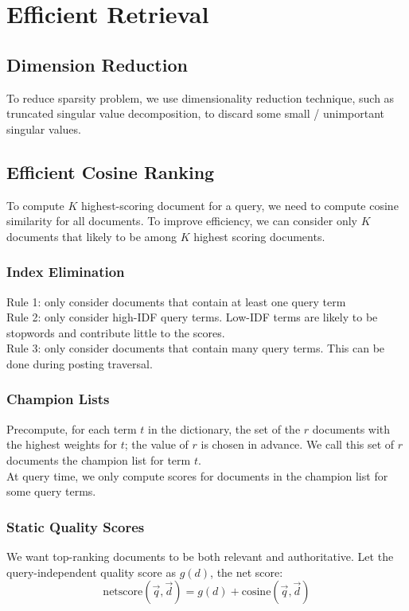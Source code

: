 \chapter{Efficient Retrieval}

\begin{multicols*}{2}
\section{Dimension Reduction}

\noindent To reduce sparsity problem, we use dimensionality reduction technique, such as truncated singular value decomposition, to discard some small / unimportant singular values. 

\section{Efficient Cosine Ranking}
\noindent To compute $K$ highest-scoring document for a query, we need to compute cosine similarity for all documents. To improve efficiency, we can consider only $K$ documents that likely to be among $K$ highest scoring documents. 

\subsection{Index Elimination}
\noindent Rule 1: only consider documents that contain at least one query term \\
\noindent Rule 2: only consider high-IDF query terms. Low-IDF terms are likely to be stopwords and contribute little to the scores. \\
\noindent Rule 3: only consider documents that contain many query terms. This can be done during posting traversal. 

\subsection{Champion Lists}
\noindent Precompute, for each term $t$ in the dictionary, the set of the $r$ documents with the highest weights for $t$; the value of $r$ is chosen in advance. We call this set of $r$ documents the champion list for term $t$.\\

\noindent At query time, we only compute scores for documents in the champion list for some query terms. 

\subsection{Static Quality Scores}
\noindent We want top-ranking documents to be both relevant and authoritative. Let the query-independent quality score as $g(d)$, the net score:
$$\text{netscore}(\vec{q},\vec{d})=g(d) + \text{cosine} (\vec{q},\vec{d})$$


\end{multicols*}
